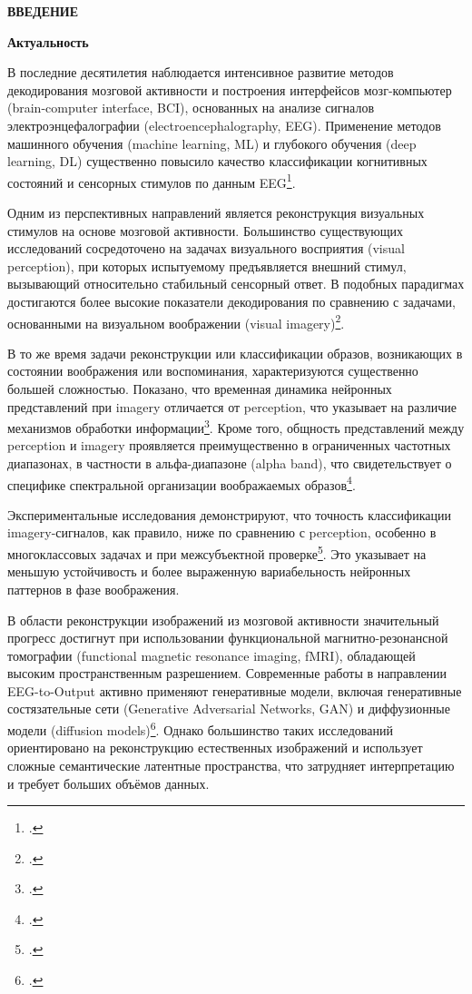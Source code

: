 \newpage
\begin{center}
  \textbf{\large ВВЕДЕНИЕ}
\end{center}


\textbf{Актуальность}

В последние десятилетия наблюдается интенсивное развитие методов декодирования мозговой активности и построения интерфейсов мозг-компьютер (brain-computer interface, BCI),
основанных на анализе сигналов электроэнцефалографии (electroencephalography, EEG). 
Применение методов машинного обучения (machine learning, ML) и глубокого обучения (deep learning, DL) 
существенно повысило качество классификации когнитивных состояний и сенсорных стимулов по данным EEG\footcite{10.1088/1741-2552/aab2f2,10.1016/j.jneumeth.2019.108378}. 

Одним из перспективных направлений является реконструкция визуальных стимулов на основе мозговой активности. 
Большинство существующих исследований сосредоточено на задачах визуального восприятия (visual perception), при которых испытуемому предъявляется внешний стимул, вызывающий относительно стабильный сенсорный ответ. 
В подобных парадигмах достигаются более высокие показатели декодирования по сравнению с задачами, 
основанными на визуальном воображении (visual imagery)\footcite{10.3390/electronics11172706,10.1109/tnsre.2024.3410870,10.1016/j.eswa.2025.127076}.

В то же время задачи реконструкции или классификации образов, возникающих в состоянии воображения или воспоминания, характеризуются существенно большей сложностью. 
Показано, что временная динамика нейронных представлений при imagery отличается от perception, что указывает на различие механизмов обработки информации\footcite{10.7554/elife.33904}. 
Кроме того, общность представлений между perception и imagery проявляется преимущественно в ограниченных частотных диапазонах, в частности в альфа-диапазоне (alpha band), 
что свидетельствует о специфике спектральной организации воображаемых образов\footcite{10.1016/j.cub.2020.04.074}. 

Экспериментальные исследования демонстрируют, что точность классификации imagery-сигналов, как правило, 
ниже по сравнению с perception, особенно в многоклассовых задачах и при межсубъектной проверке\footcite{10.3390/electronics11172706,10.1109/tnsre.2024.3410870,10.1016/j.eswa.2025.127076}. 
Это указывает на меньшую устойчивость и более выраженную вариабельность нейронных паттернов в фазе воображения.

В области реконструкции изображений из мозговой активности значительный прогресс достигнут при использовании функциональной магнитно-резонансной томографии (functional magnetic resonance imaging, fMRI), 
обладающей высоким пространственным разрешением. 
Современные работы в направлении EEG-to-Output активно применяют генеративные модели, 
включая генеративные состязательные сети (Generative Adversarial Networks, GAN) и диффузионные модели (diffusion models)\footcite{10.48550/arxiv.2412.19999}. 
Однако большинство таких исследований ориентировано на реконструкцию естественных изображений и использует сложные семантические латентные пространства, 
что затрудняет интерпретацию и требует больших объёмов данных.

